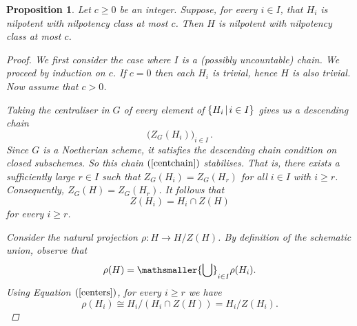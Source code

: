 \documentclass[twoside,a4paper,reqno,11pt]{amsart}
\newtheorem{proposition}[theorem]{Proposition}
\theoremstyle{definition}
\begin{document}
\begin{proposition}\label{nilclasspresschunion} Let $c\geq 0$ be an integer. Suppose, for every $i\in I$, that $H_i$ is nilpotent with nilpotency class at most $c$. Then $H$ is nilpotent with nilpotency class at most $c$.
\begin{proof} We first consider the case where $I$ is a (possibly uncountable) chain. We proceed by induction on $c$. If $c=0$ then each $H_i$ is trivial, hence $H$ is also trivial. Now assume that $c>0$.

\vspace{2mm}\noindent Taking the centraliser in $G$ of every element of $\{H_i \hspace{0.5mm}|\hspace{0.5mm}i\in I\}$ gives us a descending chain \begin{equation}\label{centchain} \big(Z_G(H_i)\big)_{i\in I}\, .\end{equation} Since $G$ is a Noetherian scheme, %
it satisfies the descending chain condition on closed subschemes. So this chain $(\ref{centchain})$ stabilises. %
That is, there exists a sufficiently large $r\in I$ such that $Z_G(H_i)=Z_G(H_r)$ for all $i\in I$ with $i \geq r$. Consequently, $Z_G(H)=Z_G(H_r)$. %
It follows that \begin{equation}\label{centers} Z(H_i)=H_i\cap Z(H)\end{equation} for every $i\geq r$. %

\vspace{2mm}\noindent Consider the natural projection $\rho:H\to H/Z(H)$. By definition of the schematic union, observe that \begin{equation}\label{imunion}\rho(H)=\mathsmaller{\bigcup}_{i\in I}\rho(H_i).\end{equation} %
Using Equation $(\ref{centers})$, for every $i\geq r$ we have \begin{equation}\label{rhoHi}\rho(H_i)%
\cong H_i/(H_i \cap Z(H))=H_i/Z(H_i).\end{equation}


\end{proof}
\end{proposition}
\end{document}
